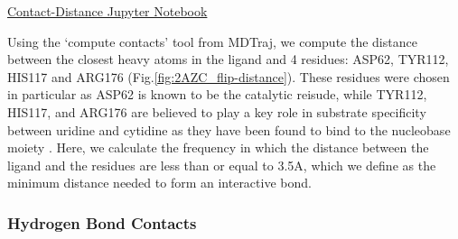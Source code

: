 \documentclass[fleqn,10pt]{wlscirep}
\begin{document}
\href{https://github.com/nathanmlim/Spitale/blob/master/manual_md/notebooks/contact-distance.ipynb}{Contact-Distance Jupyter Notebook}

Using the `compute contacts' tool from MDTraj, we compute the distance between the closest heavy atoms in the ligand and 4 residues: ASP62, TYR112, HIS117 and ARG176 (Fig.\ref{fig:2AZC_flip-distance}).
These residues were chosen in particular as ASP62 is known to be the catalytic reisude, while TYR112, HIS117, and ARG176 are believed to play a key role in substrate specificity between uridine and cytidine as they have been found to bind to the nucleobase moiety \cite{tanaka}.
Here, we calculate the frequency in which the distance between the ligand and the residues are less than or equal to 3.5A, which we define as the minimum distance needed to form an interactive bond.

\subsubsection{Hydrogen Bond Contacts}
\end{document}
